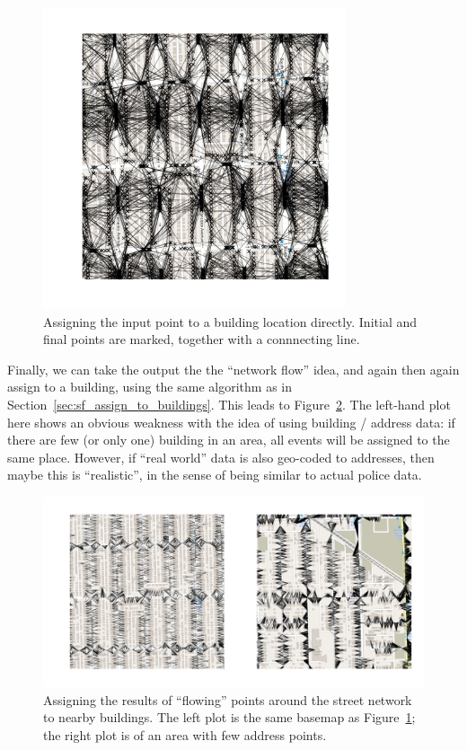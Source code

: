 \documentclass[twoside,a4paper,twocolumn,10pt]{article}
\theoremstyle{plain}
\theoremstyle{definition}
\begin{document}
\begin{figure}
  \includegraphics[width=3.5in]{chicago_buildings_1.png}
  \caption{Assigning the input point to a building location directly.  Initial and final
points are marked, together with a connnecting line.}
  \label{fig:chicago_buildings_1}
\end{figure}

Finally, we can take the output the the ``network flow'' idea, and again then again assign
to a building, using the same algorithm as in Section~\ref{sec:sf_assign_to_buildings}.
This leads to Figure~\ref{fig:chicago_buildings_2}.  The left-hand plot here shows an
obvious weakness with the idea of using building / address data: if there are few (or only one)
building in an area, all events will be assigned to the same place.  However, if ``real world''
data is also geo-coded to addresses, then maybe this is ``realistic'', in the sense of
being similar to actual police data.

\begin{figure}
  \includegraphics[width=\textwidth]{chicago_buildings_after_flow.png}
  \caption{Assigning the results of ``flowing'' points around the street network to
nearby buildings.  The left plot is the same basemap as Figure~\ref{fig:chicago_buildings_1};
the right plot is of an area with few address points.}
  \label{fig:chicago_buildings_2}
\end{figure}
\end{document}
